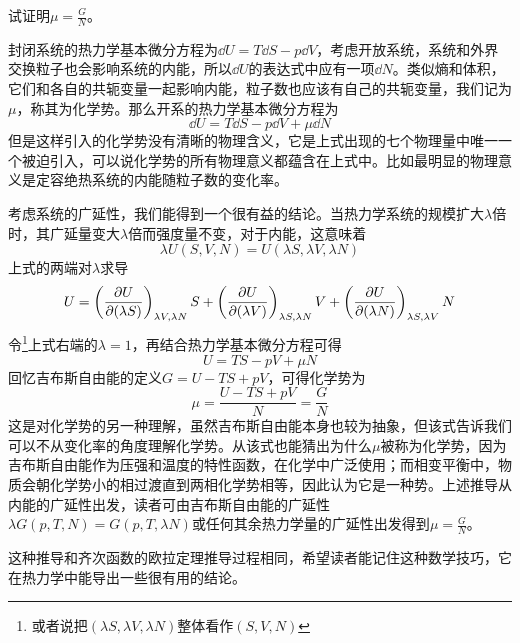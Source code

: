 \documentclass[../../main.tex]{subfiles}
\begin{document}
\begin{example}\label{ex:化学势单吉布斯能证明}
    试证明\(\mu=\frac{G}{N}\)。
    \begin{solution}
        封闭系统的热力学基本微分方程为\(\dd U=T\dd S-p\dd V\)，考虑开放系统，系统和外界交换粒子也会影响系统的内能，所以\(\dd U\)的表达式中应有一项\(\dd N\)。类似熵和体积，它们和各自的共轭变量一起影响内能，粒子数也应该有自己的共轭变量，我们记为\(\mu\)，称其为化学势。那么开系的热力学基本微分方程为
        \begin{equation}
            \dd U=T\dd S-p\dd V+\mu\dd N
        \end{equation}
        但是这样引入的化学势没有清晰的物理含义，它是上式出现的七个物理量中唯一一个被迫引入，可以说化学势的所有物理意义都蕴含在上式中。比如最明显的物理意义是定容绝热系统的内能随粒子数的变化率。

        考虑系统的广延性，我们能得到一个很有益的结论。当热力学系统的规模扩大\(\lambda\)倍时，其广延量变大\(\lambda\)倍而强度量不变，对于内能，这意味着
        \begin{equation}
            \lambda U(S,V,N)=U(\lambda S,\lambda V,\lambda N)
        \end{equation}
        上式的两端对\(\lambda\)求导
        \begin{equation}
            U=\left(\pdv{U}{(\lambda S)}\right)_{\lambda V,\lambda N}S+\left(\pdv{U}{(\lambda V)}\right)_{\lambda S,\lambda N}V+\left(\pdv{U}{(\lambda N)}\right)_{\lambda S,\lambda V}N
        \end{equation}
        令\footnote{或者说把\((\lambda S,\lambda V,\lambda N)\)整体看作\((S,V,N)\)}上式右端的\(\lambda=1\)，再结合热力学基本微分方程可得
        \begin{equation}
            U=TS-pV+\mu N
        \end{equation}
        回忆吉布斯自由能的定义\(G=U-TS+pV\)，可得化学势为
    \begin{equation}
        \mu=\frac{U-TS+pV}{N}=\frac{G}{N}
    \end{equation}
    这是对化学势的另一种理解，虽然吉布斯自由能本身也较为抽象，但该式告诉我们可以不从变化率的角度理解化学势。从该式也能猜出为什么\(\mu\)被称为化学势，因为吉布斯自由能作为压强和温度的特性函数，在化学中广泛使用；而相变平衡中，物质会朝化学势小的相过渡直到两相化学势相等，因此认为它是一种势。上述推导从内能的广延性出发，读者可由吉布斯自由能的广延性\(\lambda G(p,T,N)=G(p,T,\lambda N)\)或任何其余热力学量的广延性出发得到\(\mu=\frac{G}{N}\)。
    
    这种推导和齐次函数的欧拉定理推导过程相同，希望读者能记住这种数学技巧，它在热力学中能导出一些很有用的结论。
    \end{solution}
\end{example}
\end{document}
